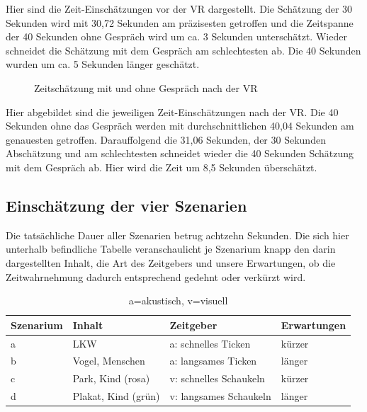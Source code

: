 \documentclass{Paper}
\begin{document}
Hier sind die Zeit-Einschätzungen vor der VR dargestellt.
Die Schätzung der 30 Sekunden wird mit 30,72 Sekunden am präzisesten getroffen und die Zeitspanne der 40 Sekunden ohne Gespräch wird um ca. 3 Sekunden unterschätzt. Wieder schneidet die Schätzung mit dem Gespräch am schlechtesten ab. Die 40 Sekunden wurden um ca. 5 Sekunden länger geschätzt. 
 

\begin{figure}[H]
\caption{Zeitschätzung mit und ohne Gespräch nach der VR}
\label{ZeitNachVR}
\end{figure}

Hier abgebildet sind die jeweiligen Zeit-Einschätzungen nach der VR. 
Die 40 Sekunden ohne das Gespräch werden mit durchschnittlichen 40,04 Sekunden am genauesten getroffen. Darauffolgend die 31,06 Sekunden, der 30 Sekunden Abschätzung und am schlechtesten schneidet wieder die 40 Sekunden Schätzung mit dem Gespräch ab. Hier wird die Zeit um 8,5 Sekunden überschätzt.


\subsection{Einschätzung der vier Szenarien}
\newpage
Die tatsächliche Dauer aller Szenarien betrug achtzehn Sekunden. Die sich hier unterhalb befindliche Tabelle veranschaulicht je Szenarium knapp den darin dargestellten Inhalt, die Art des Zeitgebers und unsere Erwartungen, ob die Zeitwahrnehmung dadurch entsprechend gedehnt oder verkürzt wird.
\begin{table}[H]
\centering
\begin{tabular}{llll}
	\hline
	\textbf{Szenarium} & \textbf{Inhalt} & \textbf{Zeitgeber}& \textbf{Erwartungen} \\
	\hline
	a & LKW & a: schnelles Ticken & kürzer \\
	b & Vogel, Menschen & a: langsames Ticken & länger\\
	c & Park, Kind (rosa) & v: schnelles Schaukeln & kürzer\\
	d & Plakat, Kind (grün) & v: langsames Schaukeln & länger \\
	\hline
\end{tabular}
\caption{a=akustisch, v=visuell}
\label{AkVis}
\end{table}
\end{document}
